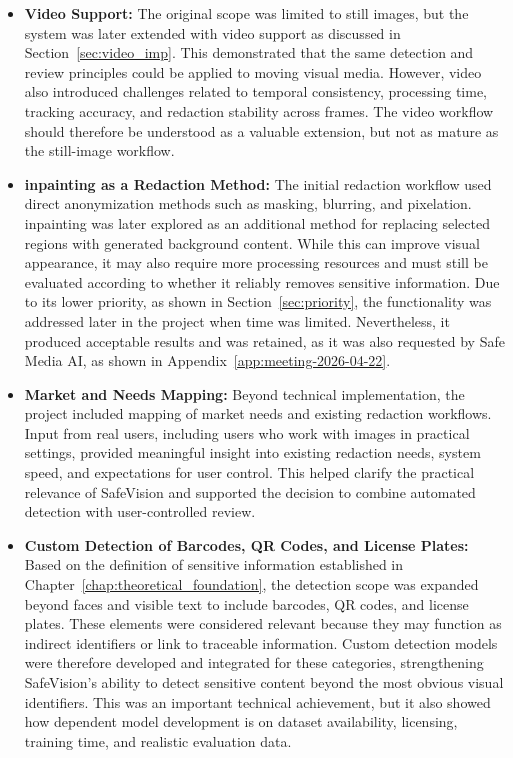 \begin{itemize}
    \item \textbf{Video Support:} The original scope was limited to still images, but the system was later extended with video support as discussed in Section~\ref{sec:video_imp}. This demonstrated that the same detection and review principles could be applied to moving visual media. However, video also introduced challenges related to temporal consistency, processing time, tracking accuracy, and redaction stability across frames. The video workflow should therefore be understood as a valuable extension, but not as mature as the still-image workflow.

    \medskip

    \item \textbf{\Gls{inpainting} as a Redaction Method:} The initial redaction workflow used direct \gls{anonymization} methods such as \gls{masking}, blurring, and pixelation. \Gls{inpainting} was later explored as an additional method for replacing selected regions with generated background content. While this can improve visual appearance, it may also require more processing resources and must still be evaluated according to whether it reliably removes sensitive information. Due to its lower priority, as shown in Section~\ref{sec:priority}, the functionality was addressed later in the project when time was limited. Nevertheless, it produced acceptable results and was retained, as it was also requested by Safe Media AI, as shown in Appendix~\ref{app:meeting-2026-04-22}.

    \medskip

    \item \textbf{Market and Needs Mapping:} Beyond technical implementation, the project included mapping of market needs and existing redaction workflows. Input from real users, including users who work with images in practical settings, provided meaningful insight into existing redaction needs, system speed, and expectations for user control. This helped clarify the practical relevance of \gls{SafeVision} and supported the decision to combine automated detection with user-controlled review.

    \medskip

    \item \textbf{Custom Detection of Barcodes, QR Codes, and License Plates:} 
    Based on the definition of sensitive information established in Chapter~\ref{chap:theoretical_foundation}, the detection scope was expanded beyond faces and visible text to include barcodes, QR codes, and license plates. These elements were considered relevant because they may function as indirect identifiers or link to traceable information. Custom detection models were therefore developed and integrated for these categories, strengthening \gls{SafeVision}’s ability to detect sensitive content beyond the most obvious visual identifiers. This was an important technical achievement, but it also showed how dependent model development is on dataset availability, licensing, training time, and realistic evaluation data.


\end{itemize}
